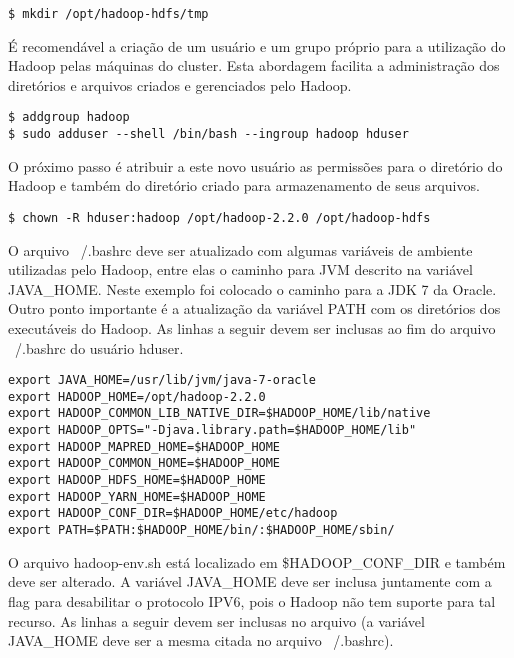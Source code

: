 \begin{apendicesenv}
\begin{lstlisting}[style=abnt,frame=single]
$ mkdir /opt/hadoop-hdfs/tmp
\end{lstlisting}

É recomendável a criação de um usuário e um grupo próprio para a utilização do Hadoop pelas máquinas do cluster. Esta abordagem facilita a administração dos diretórios e arquivos criados e gerenciados pelo Hadoop.

\begin{lstlisting}[style=abnt,frame=single]
$ addgroup hadoop
$ sudo adduser --shell /bin/bash --ingroup hadoop hduser
\end{lstlisting}

O próximo passo é atribuir a este novo usuário as permissões para o diretório do Hadoop e também do diretório criado para armazenamento de seus arquivos.

\begin{lstlisting}[style=abnt,frame=single]
$ chown -R hduser:hadoop /opt/hadoop-2.2.0 /opt/hadoop-hdfs
\end{lstlisting}

O arquivo ~/.bashrc deve ser atualizado com algumas variáveis de ambiente utilizadas pelo Hadoop, entre elas o caminho para JVM descrito na variável JAVA\_HOME. Neste exemplo foi colocado o caminho para a JDK 7 da Oracle. Outro ponto importante é a atualização da variável PATH com os diretórios dos executáveis do Hadoop. As linhas a seguir devem ser inclusas ao fim do arquivo ~/.bashrc do usuário hduser.

\begin{lstlisting}[style=abnt,frame=single]
export JAVA_HOME=/usr/lib/jvm/java-7-oracle 
export HADOOP_HOME=/opt/hadoop-2.2.0 
export HADOOP_COMMON_LIB_NATIVE_DIR=$HADOOP_HOME/lib/native 
export HADOOP_OPTS="-Djava.library.path=$HADOOP_HOME/lib" 
export HADOOP_MAPRED_HOME=$HADOOP_HOME 
export HADOOP_COMMON_HOME=$HADOOP_HOME 
export HADOOP_HDFS_HOME=$HADOOP_HOME 
export HADOOP_YARN_HOME=$HADOOP_HOME 
export HADOOP_CONF_DIR=$HADOOP_HOME/etc/hadoop 
export PATH=$PATH:$HADOOP_HOME/bin/:$HADOOP_HOME/sbin/
\end{lstlisting}

O arquivo hadoop-env.sh está localizado em \$HADOOP\_CONF\_DIR e também deve ser alterado. A variável JAVA\_HOME deve ser inclusa juntamente com a flag para desabilitar o protocolo IPV6, pois o Hadoop não tem suporte para tal recurso. As linhas a seguir devem ser inclusas no arquivo (a variável JAVA\_HOME deve ser a mesma citada no arquivo ~/.bashrc).


\end{apendicesenv}
